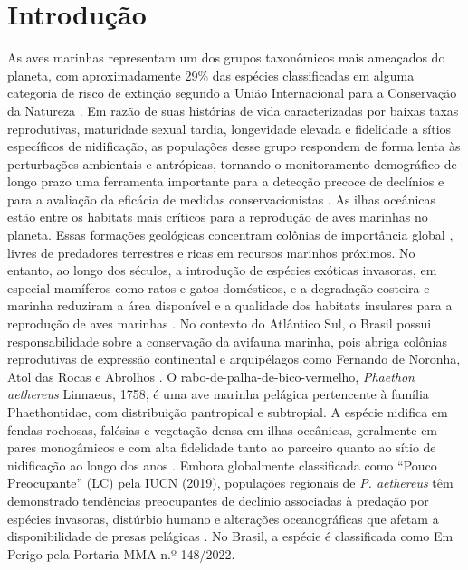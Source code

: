\documentclass[11pt]{article}
\newcommand{\todorevisao}[1]{%
  \todo[color=green!20]{Revisão: #1}}
\begin{document}
\section{Introdução}\todorevisao{ Atualizar e revisar com calma as referencias }
\doublespacing
As aves marinhas representam um dos grupos taxonômicos mais ameaçados do planeta, com aproximadamente 29\% das espécies classificadas em alguma categoria de risco de extinção segundo a União Internacional para a Conservação da Natureza \parencite{IUCN2019}. Em razão de suas histórias de vida caracterizadas por baixas taxas reprodutivas, maturidade sexual tardia, longevidade elevada e  fidelidade a sítios específicos de nidificação, as populações desse grupo respondem de forma lenta às perturbações ambientais e antrópicas, tornando o monitoramento demográfico de longo prazo uma ferramenta importante para a detecção precoce de declínios e para a avaliação da eficácia de medidas conservacionistas \parencite{xxxx}.
As ilhas oceânicas estão entre os habitats mais críticos para a reprodução de aves marinhas no planeta. Essas formações geológicas concentram colônias de importância global \parencite{SarmentoEtAl2014}, livres de predadores terrestres e ricas em recursos marinhos próximos. No entanto, ao longo dos séculos, a introdução de espécies exóticas invasoras, em especial mamíferos como ratos e gatos domésticos, e a degradação costeira e marinha reduziram a área disponível e a qualidade dos habitats insulares para a reprodução de aves marinhas \parencite{xx}. No contexto do Atlântico Sul, o Brasil possui responsabilidade sobre a conservação da avifauna marinha, pois abriga colônias reprodutivas de expressão continental e arquipélagos como Fernando de Noronha, Atol das Rocas e Abrolhos \parencite{xxx}.
O rabo-de-palha-de-bico-vermelho, \textit{Phaethon aethereus} Linnaeus, 1758, é uma ave marinha pelágica pertencente à família Phaethontidae, com distribuição pantropical e subtropial. A espécie nidifica em fendas rochosas, falésias e vegetação densa em ilhas oceânicas, geralmente em pares monogâmicos e com alta fidelidade tanto ao parceiro quanto ao sítio de nidificação ao longo dos anos \parencite{xxx}. Embora globalmente classificada como ``Pouco Preocupante'' (LC) pela IUCN (2019), populações regionais de \textit{P. aethereus} têm demonstrado tendências preocupantes de declínio associadas à predação por espécies invasoras, distúrbio humano e alterações oceanográficas que afetam a disponibilidade de presas pelágicas \parencite{BUSCAR ARTIGOS}. No Brasil, a espécie é classificada como Em Perigo pela Portaria MMA n.º 148/2022.
\end{document}
